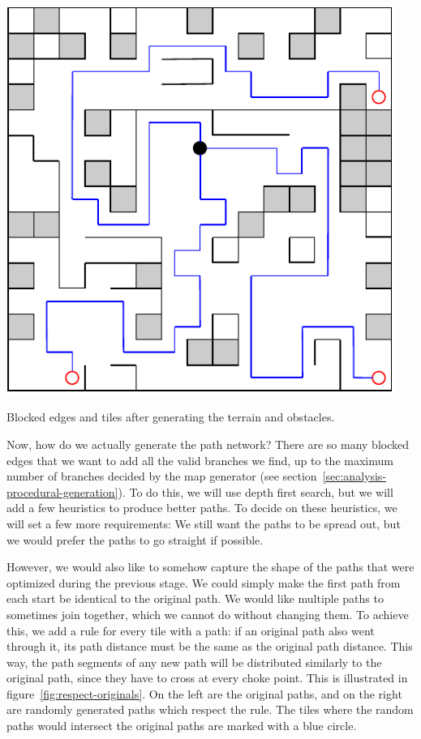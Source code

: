 \begin{center}
\begin{minipage}{.5\textwidth}
        \includegraphics[width=0.95\textwidth]{img/Paths and world.pdf}
    \end{minipage}
    \caption{Blocked edges and tiles after generating the terrain and obstacles.}
    \label{fig:paths-world}
\end{center}

Now, how do we actually generate the path network?
There are so many blocked edges that we want to add all the valid branches we find, up to the maximum number of branches decided by the map generator (see section~\ref{sec:analysis-procedural-generation}).
To do this, we will use depth first search, but we will add a few heuristics to produce better paths.
To decide on these heuristics, we will set a few more requirements:
We still want the paths to be spread out, but we would prefer the paths to go straight if possible.

However, we would also like to somehow capture the shape of the paths that were optimized during the previous stage.
We could simply make the first path from each start be identical to the original path.
We would like multiple paths to sometimes join together, which we cannot do without changing them.
To achieve this, we add a rule for every tile with a path: if an original path also went through it, its path distance must be the same as the original path distance.
This way, the path segments of any new path will be distributed similarly to the original path, since they have to cross at every choke point.
This is illustrated in figure~\ref{fig:respect-originals}.
On the left are the original paths, and on the right are randomly generated paths which respect the rule.
The tiles where the random paths would intersect the original paths are marked with a blue circle.

